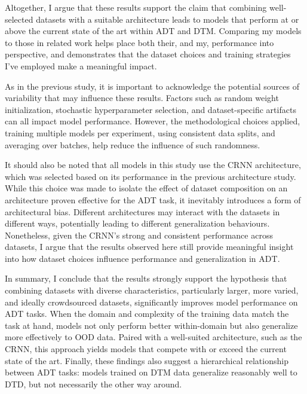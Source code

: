 Altogether, I argue that these results support the claim that combining well-selected datasets with a suitable architecture leads to models that perform at or above the current state of the art within \gls{ADT} and \gls{DTM}. Comparing my models to those in related work helps place both their, and my, performance into perspective, and demonstrates that the dataset choices and training strategies I've employed make a meaningful impact.

As in the previous study, it is important to acknowledge the potential sources of variability that may influence these results. Factors such as random weight initialization, stochastic hyperparameter selection, and dataset-specific artifacts can all impact model performance. However, the methodological choices applied, training multiple models per experiment, using consistent data splits, and averaging over batches, help reduce the influence of such randomness.

It should also be noted that all models in this study use the \acrfull{CRNN} architecture, which was selected based on its performance in the previous architecture study. While this choice was made to isolate the effect of dataset composition on an architecture proven effective for the \gls{ADT} task, it inevitably introduces a form of architectural bias. Different architectures may interact with the datasets in different ways, potentially leading to different generalization behaviours. Nonetheless, given the \gls{CRNN}'s strong and consistent performance across datasets, I argue that the results observed here still provide meaningful insight into how dataset choices influence performance and generalization in \gls{ADT}.

In summary, I conclude that the results strongly support the hypothesis that combining datasets with diverse characteristics, particularly larger, more varied, and ideally crowdsourced datasets, significantly improves model performance on \gls{ADT} tasks. When the domain and complexity of the training data match the task at hand, models not only perform better within-domain but also generalize more effectively to \acrfull{OOD} data. Paired with a well-suited architecture, such as the \acrshort{CRNN}, this approach yields models that compete with or exceed the current state of the art. Finally, these findings also suggest a hierarchical relationship between \gls{ADT} tasks: models trained on \gls{DTM} data generalize reasonably well to \gls{DTD}, but not necessarily the other way around. 